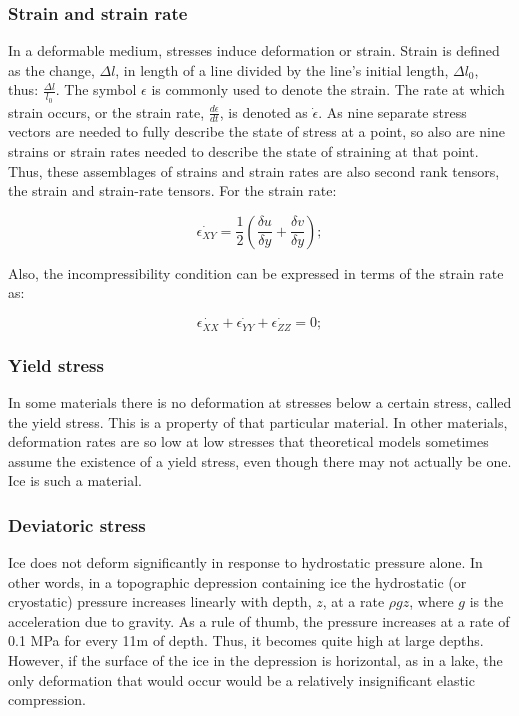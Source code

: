 \documentclass{article}
\begin{document}
\subsubsection{Strain and strain rate}
In a deformable medium, stresses induce deformation or strain. Strain is deﬁned as the change, $\Delta l$, in length of a line divided by the line's initial length, $\Delta l_0$, thus: $\frac{\Delta l}{l_0}$. The symbol $\epsilon$ is commonly used to denote the strain. The rate at which strain occurs, or the strain rate, $\frac{d\epsilon}{dt}$, is denoted as $\dot{\epsilon}$. As nine separate stress vectors are needed to fully describe the state of stress at a point, so also are nine strains or strain rates needed to describe the state of straining at that point. Thus, these assemblages of strains and strain rates are also second rank tensors, the strain and strain-rate tensors. For the strain rate:

\begin{equation}
	\dot{\epsilon_{XY}}=\frac{1}{2}({\frac{\delta u}{\delta y}+\frac{\delta v}{\delta y}});
\end{equation}

Also, the incompressibility condition can be expressed in terms of the strain rate as:

\begin{equation}
	\dot{\epsilon_{XX}}+\dot{\epsilon_{YY}}+\dot{\epsilon_{ZZ}}=0;
\end{equation}

\subsubsection{Yield stress}
In some materials there is no deformation at stresses below a certain stress, called the yield stress. This is a property of that particular material. In other materials, deformation rates are so low at low stresses that theoretical models sometimes assume the existence of a yield stress, even though there may not actually be one. Ice is such a material.

\subsubsection{Deviatoric stress}

Ice does not deform signiﬁcantly in response to hydrostatic pressure alone. In other words, in a topographic depression containing ice the hydrostatic (or
cryostatic) pressure increases linearly with depth, $z$, at a rate $\rho gz$, where $g$ is the acceleration due to gravity. As a rule of thumb, the pressure increases at a rate of 0.1 MPa for every 11m of depth. Thus, it becomes quite high at large depths. However, if the surface of the ice in the depression is horizontal, as in a lake, the only deformation that would occur would be a relatively insigniﬁcant elastic compression.
\end{document}
